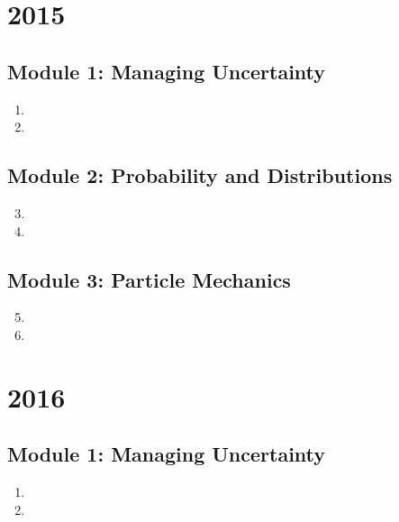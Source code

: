 \documentclass{solutionsmannual}
\begin{document}
\chapter{2015}
\section{Module 1: Managing Uncertainty}
\begin{enumerate}[label=\bfseries  \arabic*.]\setcounter{enumi}{0}
\item 
\item 
\end{enumerate}
\section{Module 2: Probability and Distributions}
\begin{enumerate}[label=\bfseries  \arabic*.]\setcounter{enumi}{2}
\item 
\item 
\end{enumerate}
\section{Module 3: Particle Mechanics}
\begin{enumerate}[label=\bfseries  \arabic*.]\setcounter{enumi}{4}
\item 
\item 
\end{enumerate}

\chapter{2016}
\section{Module 1: Managing Uncertainty}
\begin{enumerate}[label=\bfseries  \arabic*.]\setcounter{enumi}{0}
\item 
\item 
\end{enumerate}
\end{document}
